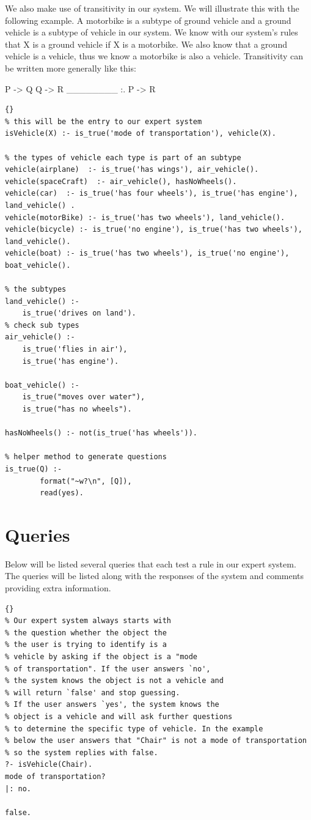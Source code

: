 We also make use of transitivity in our system.
We will illustrate this with the following example.
A motorbike is a subtype of ground vehicle
and a ground vehicle is a subtype of
vehicle in our system. We know with our system's rules
that X is a ground vehicle if X is a motorbike.
We also know that a ground vehicle is a vehicle, thus we know
a motorbike is also a vehicle.
Transitivity can be written more generally like this:

P -> Q
Q -> R
\_\_\_\_\_\_\_\_
:. P -> R

\begin{lstlisting}{}
% this will be the entry to our expert system
isVehicle(X) :- is_true('mode of transportation'), vehicle(X).

% the types of vehicle each type is part of an subtype
vehicle(airplane)  :- is_true('has wings'), air_vehicle().
vehicle(spaceCraft)  :- air_vehicle(), hasNoWheels().
vehicle(car)  :- is_true('has four wheels'), is_true('has engine'), land_vehicle() .
vehicle(motorBike) :- is_true('has two wheels'), land_vehicle().
vehicle(bicycle) :- is_true('no engine'), is_true('has two wheels'), land_vehicle().
vehicle(boat) :- is_true('has two wheels'), is_true('no engine'), boat_vehicle().

% the subtypes
land_vehicle() :-
	is_true('drives on land').
% check sub types
air_vehicle() :-
	is_true('flies in air'),
	is_true('has engine').

boat_vehicle() :-
	is_true("moves over water"),
    is_true("has no wheels").

hasNoWheels() :- not(is_true('has wheels')).

% helper method to generate questions
is_true(Q) :-
        format("~w?\n", [Q]),
        read(yes).
\end{lstlisting}

\newpage
\section{Queries} \label{man-queries}
Below will be listed several queries that each test a rule in our expert system.
The queries will be listed along with the responses of the system and comments
providing extra information.

\begin{lstlisting}{}
% Our expert system always starts with
% the question whether the object the
% the user is trying to identify is a
% vehicle by asking if the object is a "mode
% of transportation". If the user answers `no',
% the system knows the object is not a vehicle and
% will return `false' and stop guessing.
% If the user answers `yes', the system knows the
% object is a vehicle and will ask further questions
% to determine the specific type of vehicle. In the example
% below the user answers that "Chair" is not a mode of transportation
% so the system replies with false.
?- isVehicle(Chair).
mode of transportation?
|: no.

false.
\end{lstlisting}

